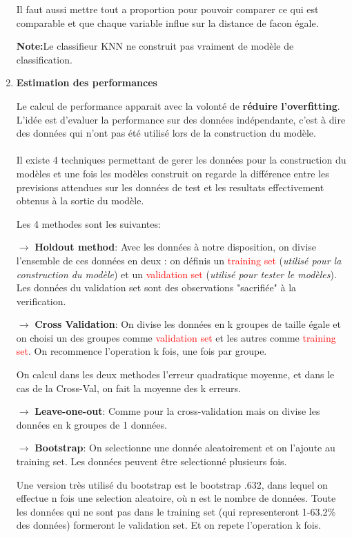 \documentclass[a4paper, 11pt, onecolumn]{article}
\begin{document}
\begin{enumerate}
\danger Il faut aussi mettre tout a proportion pour pouvoir comparer ce qui est comparable et que chaque variable influe sur la distance de facon égale.

\textbf{Note:}Le classifieur KNN ne construit pas vraiment de modèle de classification.

\item \textbf{Estimation des performances}

  Le calcul de performance apparait avec la volonté de \textbf{réduire l'overfitting}. L'idée est d'evaluer la performance sur des données indépendante, c'est à dire des données qui n'ont pas été utilisé lors de la construction du modèle.

  \paragraph{}
Il existe 4 techniques permettant de gerer les données pour la construction du modèles et une fois les modèles construit on regarde la différence entre les previsions attendues sur les données de test et les resultats effectivement obtenus à la sortie du modèle.

Les 4 methodes sont les suivantes:

$\rightarrow$ \textbf{Holdout method}: Avec les données à notre disposition, on divise l'ensemble de ces données en deux : on définis un \textcolor{red}{training set} (\textit{utilisé pour la construction du modèle}) et un \textcolor{red}{validation set} (\textit{utilisé pour tester le modèles}). Les données du validation set sont des observations "sacrifiée" à la verification.

$\rightarrow$ \textbf{Cross Validation}: On divise les données en k groupes de taille égale et on choisi un des groupes comme \textcolor{red}{validation set} et les autres comme \textcolor{red}{training set}. On recommence l'operation k fois, une fois par groupe. 

On calcul dans les deux methodes l'erreur quadratique moyenne, et dans le cas de la Cross-Val, on fait la moyenne des k erreurs.

$\rightarrow$ \textbf{Leave-one-out}: Comme pour la cross-validation mais on divise les données en k groupes de 1 données. 

$\rightarrow$ \textbf{Bootstrap}: On selectionne une donnée aleatoirement et on l'ajoute au training set. Les données peuvent être selectionné plusieurs fois. 

Une version très utilisé du bootstrap est le bootstrap .632, dans lequel on effectue n fois une selection aleatoire,  où n est le nombre de données.
Toute les données qui ne sont pas dans le training set (qui representeront 1-63.2\% des données) formeront le validation set.
Et on repete l'operation k fois.


\end{enumerate}
\end{document}
